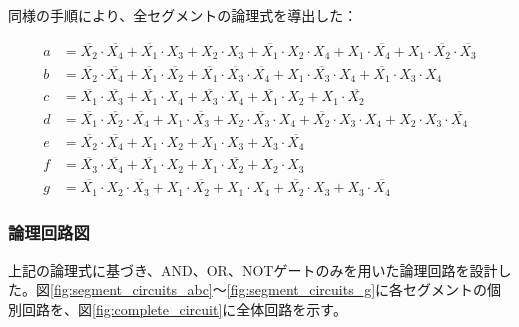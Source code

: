 \documentclass[a4j,dvipdfmx]{jsarticle}
\begin{document}
同様の手順により、全セグメントの論理式を導出した：

\begin{align}
a &= \overline{X_2} \cdot \overline{X_4} + \overline{X_1} \cdot X_3 + X_2 \cdot X_3 + \overline{X_1} \cdot X_2 \cdot X_4 + X_1 \cdot \overline{X_4} + X_1 \cdot \overline{X_2} \cdot \overline{X_3} \\
b &= \overline{X_2} \cdot \overline{X_4} + \overline{X_1} \cdot \overline{X_2} + \overline{X_1} \cdot \overline{X_3} \cdot \overline{X_4} + X_1 \cdot \overline{X_3} \cdot X_4 + \overline{X_1} \cdot X_3 \cdot X_4 \\
c &= \overline{X_1} \cdot \overline{X_3} + \overline{X_1} \cdot X_4 + \overline{X_3} \cdot X_4 + \overline{X_1} \cdot X_2 + X_1 \cdot \overline{X_2} \\
d &= \overline{X_1} \cdot \overline{X_2} \cdot \overline{X_4} + X_1 \cdot \overline{X_3} + X_2 \cdot \overline{X_3} \cdot X_4 + \overline{X_2} \cdot X_3 \cdot X_4 + X_2 \cdot X_3 \cdot \overline{X_4} \\
e &= \overline{X_2} \cdot \overline{X_4} + X_1 \cdot X_2 + X_1 \cdot X_3 + X_3 \cdot \overline{X_4} \\
f &= \overline{X_3} \cdot \overline{X_4} + \overline{X_1} \cdot X_2 + X_1 \cdot \overline{X_2} + X_2 \cdot X_3 \\
g &= \overline{X_1} \cdot X_2 \cdot \overline{X_3} + X_1 \cdot \overline{X_2} + X_1 \cdot X_4 + \overline{X_2} \cdot X_3 + X_3 \cdot \overline{X_4}
\end{align}

\newpage

\subsubsection{論理回路図}

上記の論理式に基づき、AND、OR、NOTゲートのみを用いた論理回路を設計した。図\ref{fig:segment_circuits_abc}〜\ref{fig:segment_circuits_g}に各セグメントの個別回路を、図\ref{fig:complete_circuit}に全体回路を示す。
\end{document}
